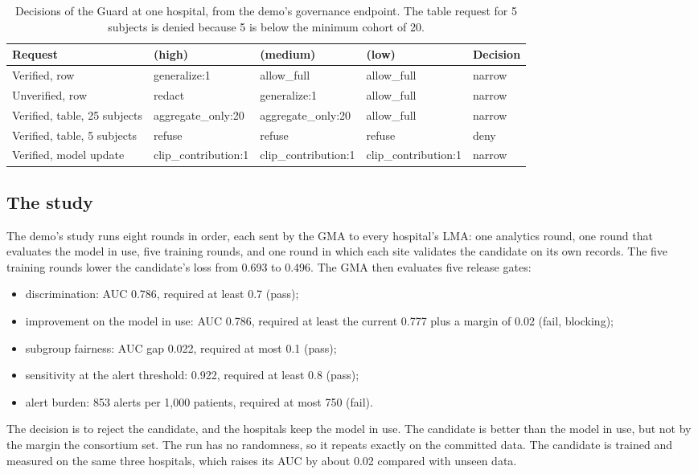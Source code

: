 \begin{table}[h]
\centering
\small
\begin{tabularx}{\linewidth}{@{}Y l l l l@{}}
\toprule
Request &  (high) &  (medium) &  (low) & Decision \\
\midrule
Verified, row & generalize:1 & allow\_full & allow\_full & narrow \\
Unverified, row & redact & generalize:1 & allow\_full & narrow \\
Verified, table, 25 subjects & aggregate\_only:20 & aggregate\_only:20 & allow\_full & narrow \\
Verified, table, 5 subjects & refuse & refuse & refuse & deny \\
Verified, model update & clip\_contribution:1 & clip\_contribution:1 & clip\_contribution:1 & narrow \\
\bottomrule
\end{tabularx}
\caption{Decisions of the Guard at one hospital, from the demo's governance
endpoint. The table request for 5 subjects is denied because 5 is below the
minimum cohort of 20.}
\label{tab:probe}
\end{table}

\subsection{The study}

The demo's study runs eight rounds in order, each sent by the GMA to every
hospital's LMA: one analytics round, one round that evaluates the model in use,
five training rounds, and one round in which each site validates the candidate
on its own records. The five training rounds lower the candidate's loss from
0.693 to 0.496. The GMA then evaluates five release gates:
\begin{itemize}
  \item discrimination: AUC 0.786, required at least 0.7 (pass);
  \item improvement on the model in use: AUC 0.786, required at least the
        current 0.777 plus a margin of 0.02 (fail, blocking);
  \item subgroup fairness: AUC gap 0.022, required at most 0.1 (pass);
  \item sensitivity at the alert threshold: 0.922, required at least 0.8
        (pass);
  \item alert burden: 853 alerts per 1,000 patients, required at most 750
        (fail).
\end{itemize}
The decision is to reject the candidate, and the hospitals keep the model in
use. The candidate is better than the model in use, but not by the margin the
consortium set. The run has no randomness, so it repeats exactly on the
committed data. The candidate is trained and measured on the same three
hospitals, which raises its AUC by about 0.02 compared with unseen data.

